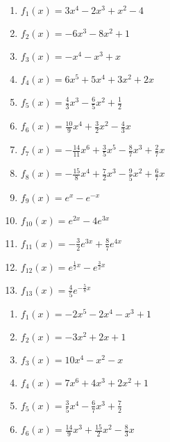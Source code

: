 \documentclass[a4paper,12pt, headsepline, ngerman]{scrartcl}
\theoremstyle{definition}
\begin{document}
\begin{minipage}{\textwidth}
\begin{minipage}{.4\textwidth}
	\begin{Exercise}[title={\raggedright Bestimme jeweils eine Stammfunktion.}, label=stammfunktionenA1]
		\begin{enumerate}[label=\alph*)]
			\item \(f_1(x)=3x^4-2x^3+x^2-4\)
			\item \(f_2(x)=-6x^3-8x^2+1\)
			\item \(f_3(x)=-x^4-x^3+x\)
			\item \(f_4(x)=6x^5+5x^4+3x^2+2x\)
			\item \(f_5(x)=\frac{4}{3}x^3-\frac{6}{5}x^2+\frac{1}{2}\)
			\item \(f_6(x)=\frac{10}{9}x^4+\frac{3}{2}x^2-\frac{4}{3}x\)
			\item \(f_7(x)=-\frac{14}{11}x^6+\frac{3}{5}x^5-\frac{8}{7}x^3+\frac{2}{7}x\)
			\item \(f_8(x)=-\frac{15}{8}x^4+\frac{7}{2}x^3-\frac{9}{5}x^2+\frac{6}{7}x\)
			\item \(f_9(x)=e^x-e^{-x}\)
			\item \(f_{10}(x)=e^{2x}-4e^{3x}\)
			\item \(f_{11}(x)=-\frac{3}{2}e^{3x}+\frac{8}{7}e^{4x}\)
			\item \(f_{12}(x)=e^{\frac{1}{2}x}-e^{\frac{3}{2}x}\)
			\item \(f_{13}(x)=\frac{4}{5}e^{-\frac{5}{8}x}\)
		\end{enumerate}
	\end{Exercise}
\end{minipage}
\begin{minipage}{.1\textwidth}
	\phantom{text}
\end{minipage}
\begin{minipage}{.4\textwidth}
\begin{Exercise}[title={\raggedright Bestimme jeweils alle Stammfunktionen.}, label=stammfunktionenA2]
	\begin{enumerate}[label=\alph*)]
		\item \(f_1(x)=-2x^5-2x^4-x^3+1\)
		\item \(f_2(x)=-3x^2+2x+1\)
		\item \(f_3(x)=10x^4-x^2-x\)
		\item \(f_4(x)=7x^6+4x^3+2x^2+1\)
		\item \(f_5(x)=\frac{3}{5}x^4-\frac{6}{7}x^3+\frac{7}{2}\)
		\item \(f_6(x)=\frac{14}{9}x^3+\frac{15}{2}x^2-\frac{8}{3}x\)

\end{enumerate}
\end{Exercise}
\end{minipage}
\end{minipage}
\end{document}
